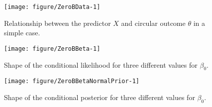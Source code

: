 \documentclass[12pt,a4paper]{article}\usepackage[]{graphicx}\usepackage[]{color}
\makeatletter
\def\maxwidth{ %
  \ifdim\Gin@nat@width>\linewidth
    \linewidth
  \else
    \Gin@nat@width
  \fi
}
\newenvironment{knitrout}{}{} %
\makeatother
\begin{document}
\begin{figure}
\label{ZeroBData}
\begin{knitrout}
\color{fgcolor}

{\centering \texttt{[image: figure/ZeroBData-1]} 

}



\end{knitrout}
\caption{Relationship between the predictor $X$ and circular outcome $\theta$ in a simple case.}
\end{figure}



\begin{figure}
\label{ZeroBBeta}
\begin{knitrout}
\color{fgcolor}

{\centering \texttt{[image: figure/ZeroBBeta-1]} 

}



\end{knitrout}
\caption{Shape of the conditional likelihood for three different values for $\beta_0$.}
\end{figure}

\begin{figure}
\label{ZeroBBetaNormalPrior}
\begin{knitrout}
\color{fgcolor}

{\centering \texttt{[image: figure/ZeroBBetaNormalPrior-1]} 

}



\end{knitrout}
\caption{Shape of the conditional posterior for three different values for $\beta_0$.}
\end{figure}

\end{document}
